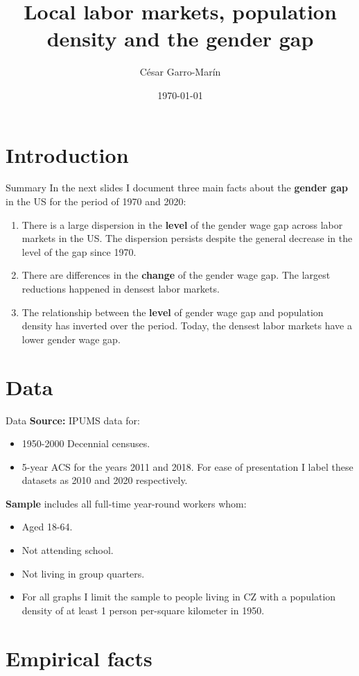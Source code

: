 \documentclass[10pt]{beamer}
\title{Local labor markets, population density and the gender gap}
\date{\today}
\author{C\'esar Garro-Mar\'in}
\institute{Boston University}
\newcommand{\bitem}{\begin{itemize}}
\newcommand{\eitem}{\end{itemize}}
\newcommand{\benu}{\begin{enumerate}}
\newcommand{\eenu}{\end{enumerate}}
\begin{document}
\maketitle

\section{Introduction}
\begin{frame}{Summary} 
	In the next slides I document three main facts about the \alert{\textbf{gender gap}} in the US for the period of 1970 and 2020:
	\benu
		\item There is a large dispersion in the \textbf{\alert{level}} of the gender wage gap across labor markets in the US. The dispersion persists despite the general decrease in the level of the gap since 1970.
		\item There are differences in the \textbf{\alert{change}} of the gender wage gap. The largest reductions happened in densest labor markets.
		\item The relationship between the \textbf{\alert{level}} of gender wage gap and population density has inverted over the period. Today, the densest labor markets have a lower gender wage gap.
	\eenu
\end{frame}

\section{Data}
\begin{frame}{Data}
	\textbf{\alert{Source:}} IPUMS data for:
		\bitem 
		\item 1950-2000 Decennial censuses.
		\item 5-year ACS for the years 2011 and 2018. For ease of presentation I label these datasets as 2010 and 2020 respectively.
	\eitem
	\textbf{\alert{Sample}} includes all full-time year-round workers whom:
	\bitem
		\item Aged 18-64.
		\item Not attending school.
		\item Not living in group quarters.
		\item For all graphs I limit the sample to people living in CZ with a population density of at least 1 person per-square kilometer in 1950.
	\eitem
\end{frame}
\section{Empirical facts}
\end{document}
